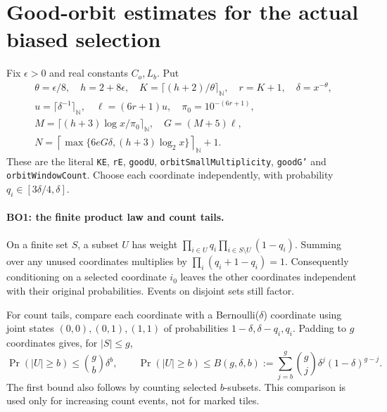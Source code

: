\section{Good-orbit estimates for the actual biased selection}
\label{sec:biased-orbits}


Fix $\epsilon>0$ and real constants $C_o,L_b$. Put
\[
\begin{gathered}
 \theta=\epsilon/8,\quad h=2+8\epsilon,\quad
 K=\lceil(h+2)/\theta\rceil_{\mathbb N},\quad r=K+1,
 \quad\delta=x^{-\theta},\\
 u=\lceil\delta^{-1}\rceil_{\mathbb N},\quad
 \ell=(6r+1)u,\quad\pi_0=10^{-(6r+1)},\\
 M=\lceil(h+3)\log x/\pi_0\rceil_{\mathbb N},\quad
 G=(M+5)\ell,\\
 N=\left\lceil\max\{6eG\delta,(h+3)\log_2x\}\right\rceil_{\mathbb N}+1.
\end{gathered}                                                   \tag{BO.1}
\]
These are the literal \texttt{KE}, \texttt{rE}, \texttt{goodU},
\texttt{orbitSmallMultiplicity}, \texttt{goodG'} and
\texttt{orbitWindowCount}. Choose each coordinate independently, with
probability $q_i\in[3\delta/4,\delta]$.

\paragraph{BO1: the finite product law and count tails.}
On a finite set $S$, a subset $U$ has weight
$\prod_{i\in U}q_i\prod_{i\in S\setminus U}(1-q_i)$.
Summing over any unused coordinates multiplies by
$\prod_i(q_i+1-q_i)=1$. Consequently conditioning on a selected
coordinate $i_0$ leaves the other coordinates independent with their
original probabilities. Events on disjoint sets still factor.

For count tails, compare each coordinate with a Bernoulli($\delta$)
coordinate using joint states $(0,0),(0,1),(1,1)$ of probabilities
$1-\delta,\delta-q_i,q_i$. Padding to $g$ coordinates gives, for
$|S|\le g$,
\[
 \Pr(|U|\ge b)\le {g\choose b}\delta^b,
 \qquad
 \Pr(|U|\ge b)\le
 B(g,\delta,b):=\sum_{j=b}^{g}{g\choose j}\delta^j(1-\delta)^{g-j}.
                                                               \tag{BO.2}
\]
The first bound also follows by counting selected $b$-subsets. This
comparison is used only for increasing count events, not for marked tiles.

